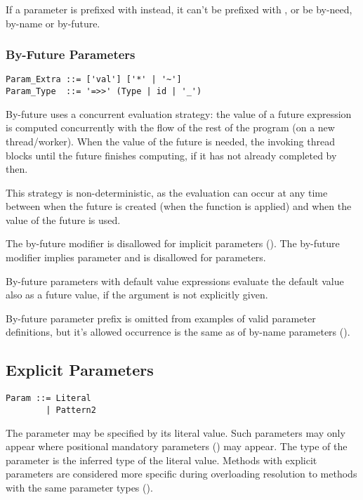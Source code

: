If a parameter is prefixed with  instead, it can't be prefixed with , or be by-need, by-name or by-future. 






\subsubsection{By-Future Parameters}
\label{sec:by-future-parameters}

\syntax\begin{lstlisting}
Param_Extra ::= ['val'] ['*' | '~']
Param_Type  ::= '=>>' (Type | id | '_')
\end{lstlisting}

By-future uses a concurrent evaluation strategy: the value of a future expression is computed concurrently with the flow of the rest of the program (on a new thread/worker). When the value of the future is needed, the invoking thread blocks until the future finishes computing, if it has not already completed by then. 

This strategy is non-deterministic, as the evaluation can occur at any time between when the future is created (when the function is applied) and when the value of the future is used. 

The by-future modifier is disallowed for implicit parameters (). The by-future modifier implies  parameter and is disallowed for  parameters. 

By-future parameters with default value expressions evaluate the default value also as a future value, if the argument is not explicitly given. 

By-future parameter prefix is omitted from examples of valid parameter definitions, but it's allowed occurrence is the same as of by-name parameters (). 





\subsection{Explicit Parameters}
\label{sec:explicit-parameters}

\syntax\begin{lstlisting}
Param ::= Literal 
        | Pattern2
\end{lstlisting}

The parameter may be specified by its literal value. Such parameters may only appear where positional mandatory parameters () may appear. The type of the parameter is the inferred type of the literal value. Methods with explicit parameters are considered more specific during overloading resolution to methods with the same parameter types (). 

